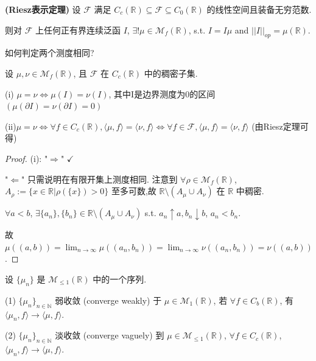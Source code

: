 \begin{theorem}{\textbf{(Riesz表示定理)}}
设 $\mathcal{F}$ 满足 $C_c(\mathbb{R}) \subseteq \mathcal{F} \subseteq C_0(\mathbb{R})$
的线性空间且装备无穷范数.

则对 $\mathcal{F}$ 上任何正有界连续泛函 $I$, $\exists! \mu \in \mathcal{M}_{f}(\mathbb{R})$,
s.t. $I=I\mu$ and $||I||_{op}=\mu(\mathbb{R})$. 
\end{theorem}


如何判定两个测度相同?
\begin{lemma}
    设 $\mu, \nu \in \mathcal{M}_f(\mathbb{R})$, 且 $\mathcal{F}$ 在 $C_c(\mathbb{R})$ 中的稠密子集.
    
(i) $\mu = \nu \iff \mu(I) = \nu(I)$, 其中I是边界测度为0的区间 $(\mu(\partial I) = \nu(\partial I) = 0)$

(ii)$\mu = \nu \iff \forall f \in C_c(\mathbb{R}), \langle \mu, f \rangle = \langle \nu, f \rangle \iff \forall f \in \mathcal{F}, \langle \mu, f \rangle = \langle \nu, f \rangle$ (由Riesz定理可得)
\end{lemma}

\begin{proof}
  (i): "$\Rightarrow$" $\checkmark$

"$\Leftarrow$" 只需说明在有限开集上测度相同.
注意到 $\forall \rho \in \mathcal{M}_{f}(\mathbb{R})$,  $A_{\rho} := \{x \in \mathbb{R} | \rho(\{x\}) > 0\}$ 至多可数,故
$\mathbb{R} \setminus (A_\mu \cup A_\nu)$ 在 $\mathbb{R}$ 中稠密.


$\forall a<b$, $\exists \{a_n\}, \{b_n\} \in \mathbb{R} \setminus (A_\mu \cup A_\nu)$
s.t. $a_n \uparrow a, b_n \downarrow b$, $a_n < b_n$.

故$\mu((a,b)) = \lim_{n\rightarrow\infty} \mu((a_n, b_n)) = \lim_{n\rightarrow\infty} \nu((a_n, b_n)) = \nu((a,b))$.  
\end{proof}

\begin{definition}
     设 $\{\mu_n\}$ 是 $\mathcal{M}_{\le1}(\mathbb{R})$ 中的一个序列.

(1) $\{\mu_n\}_{n \in \mathbb{N}}$ 弱收敛 (converge weakly) 于 $\mu \in \mathcal{M}_1(\mathbb{R})$, 若
$\forall f \in C_b(\mathbb{R})$, 有 $\langle \mu_n, f \rangle \rightarrow \langle \mu, f \rangle$.

(2) $\{\mu_n\}_{n \in \mathbb{N}}$ 淡收敛 (converge vaguely) 到 $\mu \in \mathcal{M}_{\le1}(\mathbb{R})$,
$\forall f \in C_c(\mathbb{R})$, $\langle \mu_n, f \rangle \rightarrow \langle \mu, f \rangle$.

\end{definition}

